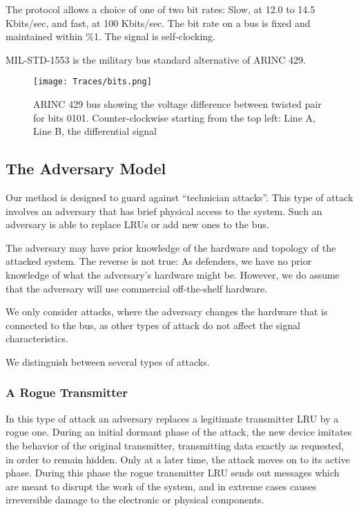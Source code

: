 \documentclass[compsoc,conference,a4paper]{IEEEtran}
\newcommand{\sublevel}[1]{\subsection{#1}}
\newcommand{\subsublevel}[1]{\subsubsection{#1}}
\newcommand{\sublevel}[1]{\section{#1}}
\newcommand{\subsublevel}[1]{\subsection{#1}}
\begin{document}
  The protocol allows a choice of one of two bit rates: Slow, at 12.0 to 14.5 Kbits/sec, and fast, at 100 Kbits/sec. The bit rate on a bus is fixed and maintained within \%1. The signal is self-clocking.
  
  MIL-STD-1553 \cite{united1986milstd1553} is the military bus standard alternative of ARINC 429.
  
  \begin{figure}[t]
    \centering
    \texttt{[image: Traces/bits.png]}
    \caption{ARINC 429 bus showing the voltage difference between twisted pair for bits 0101. Counter-clockwise starting from the top left: Line A, Line B, the differential signal}
    \label{fig:word_example}
  \end{figure}
  
\sublevel{The Adversary Model}
  Our method is designed to guard against ``technician attacks''. This type of attack involves an adversary that has brief physical access to the system. Such an adversary is able to replace LRUs or add new ones to the bus.
  
  The adversary may have prior knowledge of the hardware and topology of the attacked system. The reverse is not true: As defenders, we have no prior knowledge of what the adversary's hardware might be. However, we do assume that the adversary will use commercial off-the-shelf hardware.
  
  We only consider attacks, where the adversary changes the hardware that is connected to the bus, as other types of attack do not affect the signal characteristics.
  
  We distinguish between several types of attacks.

\subsublevel{A Rogue Transmitter}
  In this type of attack an adversary replaces a legitimate transmitter LRU by a rogue one. During an initial dormant phase of the attack, the new device imitates the behavior of the original transmitter, transmitting data exactly as requested, in order to remain hidden. Only at a later time, the attack moves on to its active phase. During this phase the rogue transmitter LRU sends out messages which are meant to disrupt the work of the system, and in extreme cases causes irreversible damage to the electronic or physical components.
  
\end{document}
